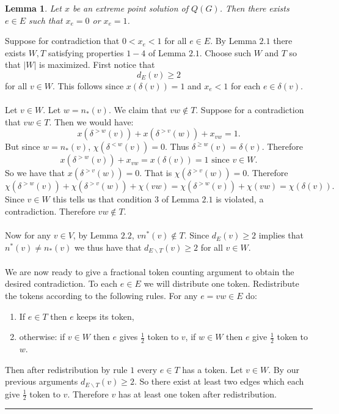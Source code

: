 \documentclass[letterpaper,12pt,oneside,onecolumn]{article}
\newtheorem{lemma}[fact]{Lemma}
\newenvironment{proof}{{\bf Proof:  }}{\hfill\rule{2mm}{2mm}}
\begin{document}
\begin{lemma}
Let $x$ be an extreme point solution of $Q(G)$. Then there exists $e \in E$ such that $x_e = 0$ or $x_e = 1$.
\end{lemma}
\begin{proof}
Suppose for contradiction that $0 < x_e < 1$ for all $e \in E$. By Lemma $2.1$ there exists $W, T$ satisfying properties $1-4$ of Lemma $2.1$. Choose such $W$ and $T$ so that $|W|$ is maximized. First notice that
$$d_E(v) \geq 2 $$
for all $v \in W$. This follows since $x(\delta(v)) = 1$ and $x_e < 1$ for each $e \in \delta(v)$.
\paragraph{}
Let $v \in W$. Let $w = n_*(v)$. We claim that $vw \not\in T$. Suppose for a contradiction that $vw \in T$. Then we would have:
$$  x(\delta^{>w}(v)) + x(\delta^{>v}(w)) + x_{vw} = 1. $$
But since $w=n_*(v)$, $\chi(\delta^{<w}(v)) = 0$. Thus $\delta^{\geq w}(v) = \delta(v)$. Therefore
$$x(\delta^{>w}(v)) + x_{vw} = x(\delta(v)) = 1 \text{ since $v \in W$}. $$
So we have that $ x(\delta^{>v}(w)) = 0 $. That is $\chi(\delta^{>v}(w)) = 0.$
Therefore $$ \chi(\delta^{>w}(v)) + \chi(\delta^{>v}(w)) + \chi(vw) = \chi(\delta^{>w}(v)) + \chi(vw) = \chi(\delta(v)). $$
Since $v \in W$ this tells us that condition $3$ of Lemma $2.1$ is violated, a contradiction. Therefore $vw \not\in T$.
\paragraph{}
Now for any $v \in V$, by Lemma $2.2$, $vn^*(v) \not\in T$. Since $d_E(v) \geq 2$ implies that $n^*(v) \neq n_*(v)$ we thus have that $d_{E\backslash T}(v) \geq 2$ for all $v \in W$.
\paragraph{}
We are now ready to give a fractional token counting argument to obtain the desired contradiction. To each $e \in E$ we will distribute one token. Redistribute the tokens according to the following rules. For any $e=vw \in E$ do:
\begin{enumerate}
\item If $e \in T$ then $e$ keeps its token,
\item otherwise:
\subitem if $v \in W$ then $e$ gives $\frac{1}{2}$ token to $v$,
\subitem if $w \in W$ then $e$ give $\frac{1}{2}$ token to $w$.
\end{enumerate}
Then after redistribution by rule $1$ every $e \in T$ has a token. Let $v \in W$. By our previous arguments $d_{E\backslash T}(v) \geq 2$. So there exist at least two edges which each give $\frac{1}{2}$ token to $v$. Therefore $v$ has at least one token after redistribution.

\end{proof}
\end{document}
